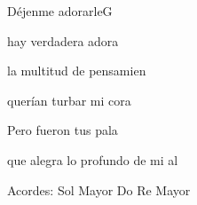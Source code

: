 \documentclass[12pt, spanish]{book}
\begin{document}
\begin{song}{Déjenme adorarle}{G}
\begin{SBOpGroup}
            hay verdadera adora

            la multitud de pensamien

            querían turbar mi cora

            Pero fueron tus pala

            que alegra lo profundo de mi al
        \end{SBOpGroup}

        \ifChordBk
        \begin{SBOpGroup}
            Acordes:\break
            \upchord{\G}\qquad Sol Mayor \hfill
            \upchord{\C}\qquad Do \hfill\null\break
            \upchord{\D}\qquad Re Mayor \hfill\null\break
        \end{SBOpGroup}
        \fi
    \end{song}
\end{document}
